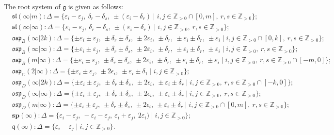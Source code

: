\documentclass[12pt]{amsart}
\newcommand\Z{\mathbb{Z}}
\newcommand\g{\mathfrak{g}}
\newcommand\fq{\mathfrak{q}}
\newcommand\fsl{\mathfrak{sl}}
\newcommand\fosp{\mathfrak{osp}}
\newcommand\D{\Delta}
\newcommand\bsp{\mathbf{sp}}
\theoremstyle{plain}
\theoremstyle{definition}
\numberwithin{equation}{section}
\begin{document}
The root system of $\g$ is given as follows:
{\footnotesize{\begin{align*}
& \fsl(\infty | m) : \D = \{\varepsilon_i - \varepsilon_j,\ \delta_r - \delta_s,\ \pm(\varepsilon_i - \delta_r)\mid i,j\in \Z_{>0}\cap [0,m],\ r,s\in \Z_{>0}\}; \\
& \fsl(\infty|\infty) : \D = \{\varepsilon_i - \varepsilon_j,\ \delta_r - \delta_s,\ \pm(\varepsilon_i - \delta_r)\mid i,j\in \Z_{>0},\ r,s\in \Z_{>0}\}; \\
& \fosp_B(\infty|2k) :  \D = \{\pm \varepsilon_i \pm \varepsilon_j,\ \pm \delta_r \pm \delta_s,\ \pm 2 \varepsilon_i,\ \pm\delta_r,\ \pm \varepsilon_i \pm \delta_r,\ \pm \varepsilon_i \mid i,j\in \Z_{>0}\cap [0,k],\ r,s\in \Z_{>0}\}; \\
& \fosp_B(\infty|\infty) : \D = \{\pm \varepsilon_i \pm \varepsilon_j,\ \pm \delta_r \pm \delta_s,\ \pm 2 \varepsilon_i,\ \pm\delta_r,\ \pm \varepsilon_i \pm \delta_r,\ \pm \varepsilon_i \mid i,j\in \Z_{>0},\ r,s\in \Z_{>0}\}; \\
& \fosp_B(m|\infty) : \D = \{\pm \varepsilon_i \pm \varepsilon_j,\ \pm \delta_r \pm \delta_s,\ \pm 2 \varepsilon_i,\ \pm\delta_r,\ \pm \varepsilon_i \pm \delta_r,\ \pm \varepsilon_i \mid  i,j\in \Z_{>0},\ r,s\in \Z_{>0}\cap [-m,0]\}; \\
& \fosp_C(2|\infty) : \D = \{\pm \varepsilon_i \pm \varepsilon_j,\ \pm 2 \epsilon_i,\ \pm \varepsilon_i \pm \delta_1 \mid i,j\in \Z_{>0}\}; \\
& \fosp_D(\infty|2k) : \D = \{\pm \varepsilon_i \pm \varepsilon_j,\ \pm \delta_r \pm \delta_s,\ \pm 2 \epsilon_i,\ \pm \varepsilon_i \pm \delta_r \mid  i,j\in \Z_{>0},\ r,s\in \Z_{>0}\cap [-k,0]\}; \\
& \fosp_D(\infty|\infty) : \D = \{\pm \varepsilon_i \pm \varepsilon_j,\ \pm \delta_r \pm \delta_s,\ \pm 2 \epsilon_i,\ \pm \varepsilon_i \pm \delta_r \mid  i,j\in \Z_{>0},\ r,s\in \Z_{>0}\}; \\
& \fosp_D(m|\infty) :  \D = \{\pm \varepsilon_i \pm \varepsilon_j,\ \pm \delta_r \pm \delta_s,\ \pm 2 \epsilon_i,\ \pm \varepsilon_i \pm \delta_r \mid  i,j\in \Z_{>0}\cap [0,m],\ r,s\in \Z_{>0}\}; \\
& \bsp(\infty) :  \D = \{\varepsilon_i - \varepsilon_j,\ -\varepsilon_i - \varepsilon_j,\ \varepsilon_i + \varepsilon_j,\ 2\varepsilon_i)\mid i,j\in \Z_{>0}\}; \\
& \fq(\infty) :  \D = \{\varepsilon_i - \varepsilon_j \mid i,j\in \Z_{>0}\}.
\end{align*}}}
\end{document}
